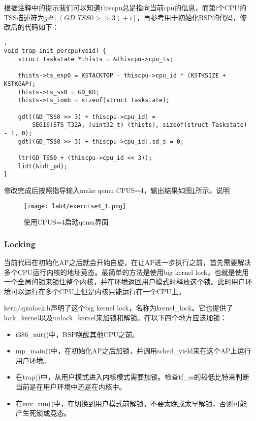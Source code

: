 \begin{exerciseSolution}{4}
    \par 根据注释中的提示我们可以知道thiscpu总是指向当前cpu的信息，而第i个CPU的TSS描述符为$gdt[(GD\_TSS0 >> 3) + i]$，再参考用于初始化BSP的代码，修改后的代码如下：
    \begin{lstlisting}，
void trap_init_percpu(void) {
    struct Taskstate *thists = &thiscpu->cpu_ts;

    thists->ts_esp0 = KSTACKTOP - thiscpu->cpu_id * (KSTKSIZE + KSTKGAP);
    thists->ts_ss0 = GD_KD;
    thists->ts_iomb = sizeof(struct Taskstate);

    gdt[(GD_TSS0 >> 3) + thiscpu->cpu_id] =
        SEG16(STS_T32A, (uint32_t) (thists), sizeof(struct Taskstate) - 1, 0);
    gdt[(GD_TSS0 >> 3) + thiscpu->cpu_id].sd_s = 0;

    ltr(GD_TSS0 + (thiscpu->cpu_id << 3));
    lidt(&idt_pd);
}
    \end{lstlisting}
    \par 修改完成后按照指导输入make qemu CPUS=4，输出结果如图\ref{fig:lab4/exercise4_1}所示。说明
    \begin{figure}[htb]
        \centering
        \texttt{[image: lab4/exercise4\_1.png]}
        \caption{使用CPUS=4启动qemu界面}
        \label{fig:lab4/exercise4_1}
    \end{figure}
\end{exerciseSolution}

\subsubsection{Locking}
\par 当前代码在初始化AP之后就会开始自旋，在让AP进一步执行之前，首先需要解决多个CPU运行内核的地址竞态。最简单的方法是使用big kernel lock，也就是使用一个全局的锁来锁住整个内核，并在环境返回用户模式时释放这个锁。此时用户环境可以运行在多个CPU上但是内核只能运行在一个CPU上。
\par kern/spinlock.h声明了这个big kernel lock，名称为kernel\_lock。它也提供了lock\_kernel以及unlock\_kernel来加锁和解锁。在以下四个地方应该加锁：
\begin{itemize}
    \item i386\_init()中，BSP唤醒其他CPU之前。
    \item mp\_main()中，在初始化AP之后加锁，并调用sched\_yield来在这个AP上运行用户环境。
    \item 在trap()中，从用户模式进入内核模式需要加锁。检查tf\_cs的较低比特来判断当前是在用户环境中还是在内核中。
    \item 在env\_run()中，在切换到用户模式前解锁。不要太晚或太早解锁，否则可能产生死锁或竞态。
\end{itemize}


